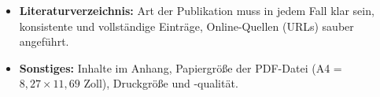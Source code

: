 \begin{table}
{\begin{minipage}{0.95\textwidth}
\begin{itemize}
				Zitate richtig referenziert, inklusive Seiten- und Kapitelangaben;
				keine ungültigen Querverweise (\textbf{??}).
			\item[$\Box$] \textbf{Literaturverzeichnis:}
				Art der Publikation muss in jedem Fall klar sein, konsistente
				und vollständige Einträge, Online-Quellen (URLs) sauber
				angeführt.
			\item[$\Box$] \textbf{Sonstiges:}
				Inhalte im Anhang, 
				Papiergröße der PDF-Datei (A4 = $8{,}27 \times 11{,}69$ Zoll), Druckgröße
				und -qualität.
		\end{itemize}
		\end{minipage}%
	}
\end{table}


